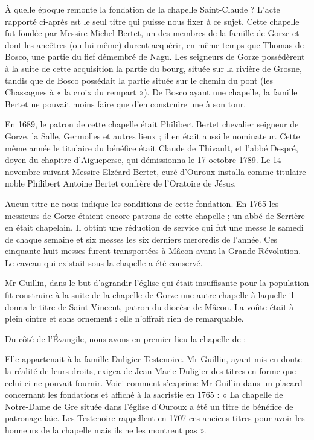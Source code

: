 À quelle époque remonte la fondation de la chapelle Saint-Claude ? L'acte rapporté ci-après est le seul titre qui puisse nous fixer à ce sujet. Cette chapelle fut fondée par Messire Michel Bertet, un des membres de la famille de Gorze et dont les ancêtres (ou lui-même) durent acquérir, en même temps que Thomas de Bosco, une partie du fief démembré de Nagu. Les seigneurs de Gorze possédèrent à la suite de cette acquisition la partie du bourg, située sur la rivière de Grosne, tandis que de Bosco possédait la partie située sur le chemin du pont (les Chassagnes à « la croix du rempart »). De Bosco ayant une chapelle, la famille Bertet ne pouvait moins faire que d'en construire une à son tour.

En 1689, le patron de cette chapelle était Philibert Bertet chevalier seigneur de Gorze, la Salle, Germolles et autres lieux ; il en était aussi le nominateur. Cette même année le titulaire du bénéfice était Claude de Thivault, et l'abbé Despré, doyen du chapitre d'Aigueperse, qui démissionna le 17 octobre 1789. Le 14 novembre suivant Messire Elzéard Bertet, curé d'Ouroux installa comme titulaire noble Philibert Antoine Bertet confrère de l'Oratoire de Jésus.

Aucun titre ne nous indique les conditions de cette fondation. En 1765 les messieurs de Gorze étaient encore patrons de cette chapelle ; un abbé de Serrière en était chapelain. Il obtint une réduction
de service qui fut une messe le samedi de chaque semaine et six messes les six derniers mercredis de l'année. Ces cinquante-huit messes furent transportées à Mâcon avant la Grande Révolution. Le caveau qui existait sous la chapelle a été conservé.


Mr Guillin, dans le but d'agrandir l'église qui était insuffisante pour la population fit construire à la suite de la chapelle de Gorze une autre chapelle à laquelle il donna le titre de Saint-Vincent, patron du diocèse de Mâcon. La voûte était à plein cintre et sans ornement : elle n'offrait rien de remarquable.

Du côté de l'Évangile, nous avons en premier lieu la chapelle de :


Elle appartenait à la famille Duligier-Testenoire. Mr Guillin, ayant mis en doute la réalité de leurs droits, exigea de Jean-Marie Duligier des titres en forme que celui-ci ne pouvait fournir. Voici comment s'exprime Mr Guillin dans un placard concernant les fondations et affiché à la sacristie en 1765 : « La chapelle de Notre-Dame de Gre située dans l'église d'Ouroux a été un titre de bénéfice de patronage laïc. Les Testenoire rappellent en 1707 ces anciens titres pour avoir les honneurs de la chapelle mais ils ne les montrent pas ».

